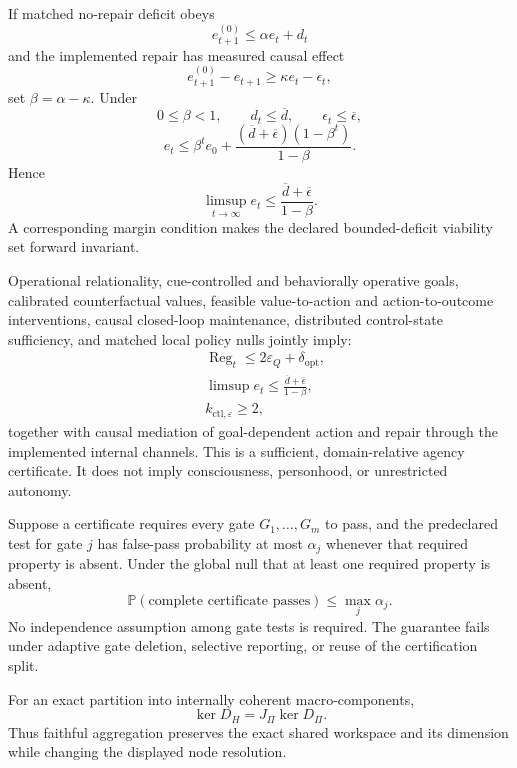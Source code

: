 If matched no-repair deficit obeys
\[
e_{t+1}^{(0)}\leq\alpha e_t+d_t
\]
and the implemented repair has measured causal effect
\[
e_{t+1}^{(0)}-e_{t+1}\geq\kappa e_t-\epsilon_t,
\]
set \(\beta=\alpha-\kappa\). Under
\[
0\leq\beta<1,
\qquad
 d_t\leq\overline d,
\qquad
 \epsilon_t\leq\overline\epsilon,
\]
\[
\boxed{
e_t
\leq
\beta^te_0
+
\frac{(\overline d+\overline\epsilon)(1-\beta^t)}{1-\beta}.
}
\]
Hence
\[
\limsup_{t\to\infty}e_t
\leq
\frac{\overline d+\overline\epsilon}{1-\beta}.
\]
A corresponding margin condition makes the declared bounded-deficit viability
set forward invariant.


Operational relationality, cue-controlled and behaviorally operative goals,
calibrated counterfactual values, feasible value-to-action and action-to-outcome
interventions, causal closed-loop maintenance, distributed control-state
sufficiency, and matched local policy nulls jointly imply:
\[
\begin{aligned}
&\operatorname{Reg}_t\leq2\varepsilon_Q+\delta_{\mathrm{opt}},\\
&\limsup e_t\leq
 \frac{\overline d+\overline\epsilon}{1-\beta},\\
&k_{\mathrm{ctl},\varepsilon}\geq2,
\end{aligned}
\]
together with causal mediation of goal-dependent action and repair through the
implemented internal channels. This is a sufficient, domain-relative agency
certificate. It does not imply consciousness, personhood, or unrestricted
autonomy.


Suppose a certificate requires every gate \(G_1,\ldots,G_m\) to pass, and the
predeclared test for gate \(j\) has false-pass probability at most \(\alpha_j\)
whenever that required property is absent. Under the global null that at least
one required property is absent,
\[
\boxed{
\mathbb P(\text{complete certificate passes})
\leq
\max_j\alpha_j.
}
\]
No independence assumption among gate tests is required. The guarantee fails
under adaptive gate deletion, selective reporting, or reuse of the
certification split.



For an exact partition into internally coherent macro-components,
\[
\boxed{
\ker D_H=J_\Pi\ker D_\Pi.
}
\]
Thus faithful aggregation preserves the exact shared workspace and its
dimension while changing the displayed node resolution.


